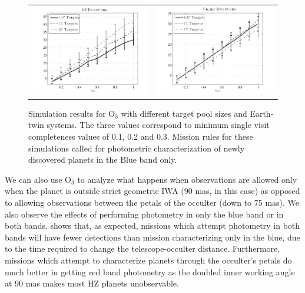 \begin{figure}[ht]
 \begin{center}
  \begin{tabular}{c c}
   \includegraphics[width=2.9in,clip=true,trim=0.25in 0in 0.5in 0in]{./figures/compComparisonA} &
   \includegraphics[width=2.9in,clip=true,trim=0.25in 0in 0.5in 0in]{./figures/compComparisonB} 
  \end{tabular}
 \end{center}
 \caption[Effects of varying target pools]{ \label{fig:compComparison} Simulation results for O$_3$ with different target pool sizes and Earth-twin systems.  The three values correspond to minimum single visit completeness values of 0.1, 0.2 and 0.3. Mission rules for these simulations called for photometric characterization of newly discovered planets in the Blue band only.}
 \end{figure}

We can also use O$_3$ to analyze what happens when observations are allowed only when the planet is outside strict geometric IWA (90 mas, in this case) as opposed to allowing observations between the petals of the occulter (down to 75 mas).   We also observe the effects of performing photometry in only the blue band or in both bands.   shows that, as expected, missions which attempt photometry in both bands will have fewer detections than mission characterizing only in the blue, due to the time required to change the telescope-occulter distance.  Furthermore, missions which attempt to characterize planets through the occulter's petals do much better in getting red band photometry as the doubled inner working angle at 90 mas makes most HZ planets unobservable.

